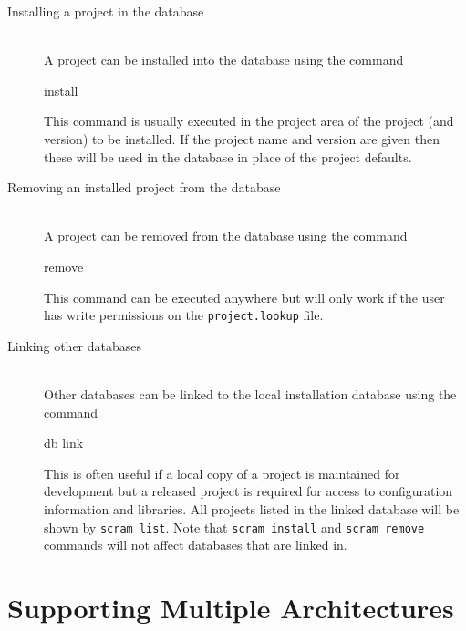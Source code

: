 \begin{description}
\item[Installing a project in the database]\mbox{}\\
  A project can be installed into the database using the command

\begin{scramcmd}{install}
  ~
\end{scramcmd}

\ni This command is usually executed in the project area of the
project (and version) to be installed.  If the project name and
version are given then these will be used in the database in place of
the project defaults.


\item[Removing an installed project from the database]\mbox{}\\
  A project can be removed from the database using the command

\begin{scramcmd}{remove}
  ~
\end{scramcmd}

\ni This command can be executed anywhere but will only work if the
user has write permissions on the \texttt{project.lookup} file.

\item[Linking other databases]\mbox{}\\
  Other databases can be linked to the local installation database
  using the command

\begin{scramcmd}{db link}
  ~
\end{scramcmd}

\ni This is often useful if a local copy of a project is maintained
for development but a released project is required for access to
configuration information and libraries. All projects listed in the
linked database will be shown by \texttt{scram list}.  Note that
\texttt{scram install} and \texttt{scram remove} commands will not
affect databases that are linked in.
\end{description}

\section{Supporting Multiple Architectures}

